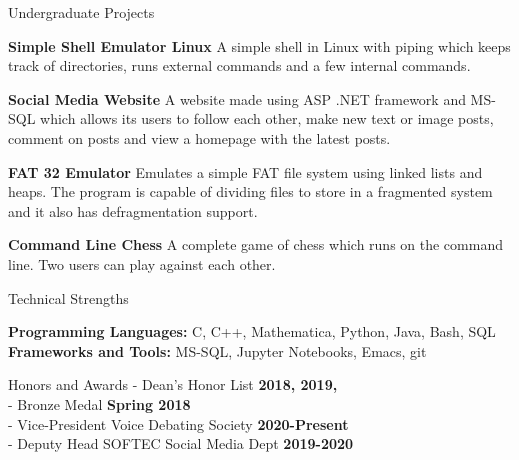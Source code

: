 \documentclass{resume} %
\begin{document}

\begin{rSection}{Undergraduate Projects}

\textbf{\large{Simple Shell Emulator Linux}} \newline
A simple shell in Linux with piping which keeps track of directories, runs external commands and a few internal commands.

\textbf{\large{Social Media Website}}
\newline
A website made using ASP .NET framework and MS-SQL which allows its users to follow each other, make new text or image posts, comment on posts and view a homepage with the latest posts.

\textbf{\large{FAT 32 Emulator}}
\newline
Emulates a simple FAT file system using linked lists and heaps. The program is capable of dividing files to store in a fragmented system and it also has defragmentation support.

\textbf{\large{Command Line Chess}} \newline
A complete game of chess which runs on the command line. Two users can play against each other.
\newline
\end{rSection}


\begin{rSection}{Technical Strengths}

{\bf Programming Languages:} C, C++, Mathematica, Python, Java, Bash, SQL\\
{\bf Frameworks and Tools:} MS-SQL, Jupyter Notebooks, Emacs, git

\end{rSection}


\begin{rSection}{Honors and Awards}
- Dean's Honor List \hfill {\bf 2018, 2019,}\\
- Bronze Medal \hfill {\bf Spring 2018}\\
- Vice-President Voice Debating Society \hfill {\bf 2020-Present}\\
- Deputy Head SOFTEC Social Media Dept \hfill {\bf 2019-2020}
\end{rSection}
\end{document}
